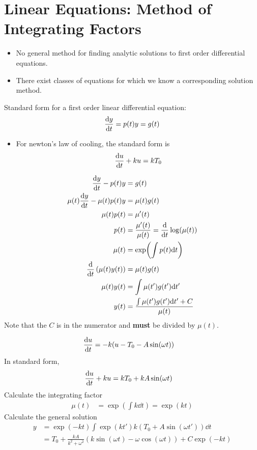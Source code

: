 \documentclass[a4paper, 10pt]{article}
\numberwithin{equation}{section}
\begin{document}
\section{Linear Equations: Method of Integrating Factors}
\begin{itemize}
    \item No general method for finding analytic solutions to first order differential equations.
    \item There exist classes of equations for which we know a corresponding solution method.
\end{itemize}
\begin{definition}
    Standard form for a first order linear differential equation:
    \begin{equation}
        \derivative{y}{t}=p(t)y=g(t)
    \end{equation}
\end{definition}
\begin{itemize}
    \item For newton's law of cooling, the standard form is 
    \begin{equation}
        \derivative{u}{t}+ku=kT_0
    \end{equation}
\end{itemize}
\begin{derivation}
    \begin{align}
        \derivative{y}{t}-p(t)y&=g(t)\\
        \mu(t)\derivative{y}{t}-\mu(t)p(t)y&=\mu(t)g(t)\\
        \mu(t)p(t)&=\mu'(t)\\
        p(t)&=\frac{\mu'(t)}{\mu(t)}=\derivative{}{t}\log(\mu(t))\\
        \mu(t)&=\exp(\int p(t)\dd t)\\
        \derivative{}{t}\left(\mu(t)y(t)\right)&=\mu(t)g(t)\\
        \mu(t)y(t)&=\int\mu(t')g(t')\dd t'\\
        y(t)&=\frac{\int\mu(t')g(t')\dd t'+C}{\mu(t)}
    \end{align}
    Note that the $C$ is in the numerator and \textbf{must} be divided by $\mu(t)$.
\end{derivation}
\begin{example}
    \begin{align}
        \derivative{u}{t}&=-k(u-T_0-A\sin(\omega t))
    \end{align}
    In standard form,
    \begin{align}
        \derivative{u}{t}+ku&=kT_0+kA\sin(\omega t)
    \end{align}
    Calculate the integrating factor
    \begin{align}
        \mu(t)&=\exp(\int k\dd t)=\exp(kt)
    \end{align}
    Calculate the general solution
    \begin{align}
        y&=\exp(-kt)\int\exp(kt')k(T_0+A\sin(\omega t'))\dd t\\
        &=T_0+\frac{kA}{k^2+\omega^2}\left(k\sin(\omega t)-\omega\cos(\omega t)\right)+C\exp(-kt)
    \end{align}
\end{example}
\end{document}
